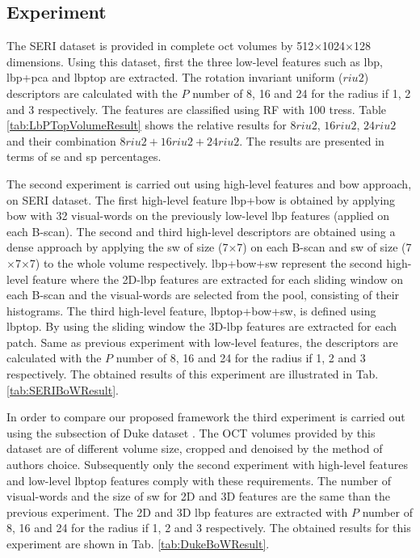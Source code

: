 \subsection{Experiment}
The SERI dataset is provided in complete \ac{oct} volumes by 512$\times$1024$\times$128 dimensions. Using this dataset, first the three low-level features such as \ac{lbp}, \ac{lbp}+\ac{pca} and \ac{lbptop} are extracted. The rotation invariant uniform ($riu2$) descriptors are calculated with the $P$ number of 8, 16 and 24 for the radius if 1, 2 and 3 respectively. The features are classified using RF with 100 tress. Table \ref{tab:LbPTopVolumeResult} shows the relative results for $8riu2$, $16riu2$, $24riu2$ and their combination $8riu2 + 16riu2 + 24riu2$. The results are presented in terms of \ac{se} and \ac{sp} percentages.  

The second experiment is carried out using high-level features and \ac{bow} approach, on SERI dataset. The first high-level feature \ac{lbp}+\ac{bow} is obtained by applying \ac{bow} with 32 visual-words on the previously low-level \ac{lbp} features (applied on each B-scan). The second and third high-level descriptors are obtained using a dense approach by applying the \ac{sw} of size (7$\times$7) on each B-scan and \ac{sw} of size (7$\times$7$\times$7) to the whole volume respectively. \ac{lbp}+\ac{bow}+\ac{sw} represent the second high-level feature where the 2D-\ac{lbp} features are extracted for each sliding window on each B-scan and the visual-words are selected from the pool, consisting of their histograms. The third high-level feature, \ac{lbptop}+\ac{bow}+\ac{sw}, is defined using \ac{lbptop}. By using the sliding window the 3D-\ac{lbp} features are extracted for each patch. Same as previous experiment with low-level features, the descriptors are calculated with the $P$ number of 8, 16 and 24 for the radius if 1, 2 and 3 respectively. The obtained results of this experiment are illustrated in Tab. \ref{tab:SERIBoWResult}. 

In order to compare our proposed framework the third experiment is carried out using the subsection of Duke dataset \cite{Srinivasan2014}. The OCT volumes provided by this dataset are of different volume size, cropped and denoised by the method of authors choice. Subsequently only the second experiment with high-level features and low-level \ac{lbptop} features comply with these requirements. The number of visual-words and the size of \ac{sw} for 2D and 3D features are the same than the previous experiment. The 2D and 3D \ac{lbp} features are extracted with $P$ number of 8, 16 and 24 for the radius if 1, 2 and 3 respectively. The obtained results for this experiment are shown in Tab. \ref{tab:DukeBoWResult}.

